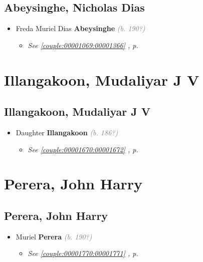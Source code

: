 \documentclass[10pt, openany]{book}
\begin{document}
\chapter{Abeysinghe, Nicholas Dias}
\label{00001367}
\textcolor{slmaroon}{\textit{}}
\begin{itemize}
\item{Freda Muriel Dias \textbf{Abeysinghe} \textcolor{gray}{\textit{(b. 190?)}}
\begin{itemize}
\item{\textcolor{slteal}{\textit{See  \autoref{couple:00001069:00001366} \textit{, p. \pageref{couple:00001069:00001366} }}}}
\end{itemize}
   }
\end{itemize}
  
\part{Illangakoon, Mudaliyar J V}
\chapter{Illangakoon, Mudaliyar J V}
\label{00001671}
\textcolor{slmaroon}{\textit{}}
\begin{itemize}
\item{Daughter \textbf{Illangakoon} \textcolor{gray}{\textit{(b. 186?)}}
\begin{itemize}
\item{\textcolor{slteal}{\textit{See  \autoref{couple:00001670:00001672} \textit{, p. \pageref{couple:00001670:00001672} }}}}
\end{itemize}
 }
\end{itemize}
   
\part{Perera, John Harry}
\chapter{Perera, John Harry}
\label{00001772}
\textcolor{slmaroon}{\textit{}}
\begin{itemize}
\item{Muriel \textbf{Perera} \textcolor{gray}{\textit{(b. 190?)}}
\begin{itemize}
\item{\textcolor{slteal}{\textit{See  \autoref{couple:00001770:00001771} \textit{, p. \pageref{couple:00001770:00001771} }}}}
\end{itemize}
 }
\end{itemize}
  
\end{document}

